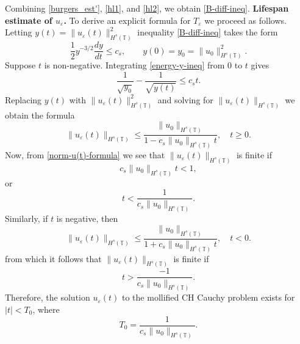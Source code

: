 \documentclass[12pt,reqno]{amsart}
\newcommand{\ci}{\mathbb{T}}
\newcommand{\ee}{\varepsilon}
\theoremstyle{plain}  %
\theoremstyle{definition}
\begin{document}
\begin{appendices}
\begin{equation}
	\end{equation}
	Combining \eqref{burgers_est'}, \eqref{hl1}, and \eqref{hl2}, we obtain
	\eqref{B-diff-ineq}.
	\vskip0.1in
	\noindent
	{\bf  Lifespan estimate of $u_\ee$.} To derive an explicit formula for
	$T_\ee$ we proceed as follows.  Letting  $y(t)=
	\|u_\ee(t)\|_{H^s(\ci)}^2$ inequality  \eqref{B-diff-ineq} takes the
	form
	\begin{equation} 
		\label{energy-y-ineq}
		\frac 12
		y^{-3/2}\frac{dy}{dt}
		\le
		c_s,
		\qquad
		y(0)=y_0=  \|u_0\|_{H^s(\ci)}^2.
	\end{equation}
	Suppose $t$ is non-negative. Integrating  \eqref{energy-y-ineq} from  0  to $t$ gives
	\begin{equation} 
		\label{energy-y-ineq-calc1}
		\frac{1}{\sqrt{y_0}}  - \frac{1}{\sqrt{y(t)}} 
		\le
		c_s t.
	\end{equation}
	Replacing $y(t)$ with   $\|u_\ee(t)\|_{H^s(\ci)}^2$  and solving for  $\|u_\ee(t)\|_{H^s(\ci)}$
	we obtain the formula
	\begin{equation} 
		\label{norm-u(t)-formula}
		\|u_\ee(t)\|_{H^s(\ci)}
		\le
		\frac{ \|u_0\|_{H^s(\ci)}}{1-c_s\|u_0\|_{H^s(\ci)} t}, \quad t\ge
		0.
	\end{equation}
	Now, from \eqref{norm-u(t)-formula} we see that  $\|u_\ee(t)\|_{H^s(\ci)}$ is finite  if 
	\begin{equation*} 
		\label{Lifespan-calc1}
		c_s    \|u_0\|_{H^s(\ci)} t<1,
	\end{equation*}
	or
	\begin{equation} 
		t
		<
		\frac{1}{ c_s \|u_0\|_{H^s(\ci)}}.
	\end{equation}
	Similarly, if $t$ is negative, then 
	\begin{equation} 
		\label{norm-u(t)-formula-prime}
		\|u_\ee(t)\|_{H^s(\ci)}
		\le
		\frac{ \|u_0\|_{H^s(\ci)}}{1+c_s\|u_0\|_{H^s(\ci)} t}, \quad t < 0.
	\end{equation}
	from which it follows that $\|u_\ee(t)\|_{H^s(\ci)}$ is finite  if 
	\begin{equation} 
		t
		>
		 \frac{-1}{ c_s \|u_0\|_{H^s(\ci)}}.
	\end{equation}
	Therefore, the  solution  $u_\ee(t)$ to the mollified CH Cauchy
	problem exists for $|t| <T_0$, where
	\begin{equation} 
		\label{CH-Lifespan}
		T_0
		=
		\frac{1}{ c_s \|u_0\|_{H^s(\ci)}}.

\end{equation}
\end{appendices}
\end{document}

